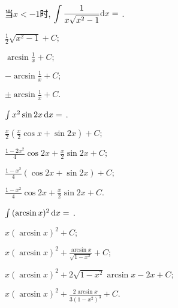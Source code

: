 \begin{problem} 当$x < - 1$时, $\displaystyle \int \frac{1}{x\sqrt{x^{2} - 1}}{\mathop{}\!\mathrm{d} x} =$ .

\begin{abcd} 
\item $\displaystyle \frac{1}{2}\sqrt{x^{2} - 1} + C; $

\item $\displaystyle \arcsin\frac{1}{x} + C; $

\item $\displaystyle - \arcsin\frac{1}{x} + C; $

\item $\displaystyle \pm \arcsin\frac{1}{x} + C.$

\end{abcd}

\end{problem}           

\begin{problem} $\int x^{2}\sin 2x\mathop{}\!\mathrm{d} x =$ .

\begin{abcd} 
	\item $\displaystyle \frac{x}{2}\left( \frac{x}{2}\cos x + \sin 2x \right) + C; $

\item $\displaystyle \frac{1 - 2x^{2}}{4}\cos 2x + \frac{x}{2}\sin 2x + C; $

\item $\displaystyle \frac{1 - x^{2}}{4}(\cos 2x + \sin 2x) + C; $

\item $\displaystyle \frac{1 - x^{2}}{4}\cos 2x + \frac{x}{2}\sin 2x + C.$

\end{abcd}

\end{problem}           

\begin{problem} $\int {(\arcsin x)^{2}}\mathop{}\!\mathrm{d} x =$ .

\begin{abcd} 
	\item $\displaystyle x(\arcsin x)^{2} + C; $

\item $\displaystyle x(\arcsin x)^{2} + \frac{\arcsin x}{\sqrt{1 - x^{2}}} + C; $

\item $\displaystyle x(\arcsin x)^{2} + 2\sqrt{1 - x^{2}}\arcsin x - 2x + C;$

\item
$\displaystyle x(\arcsin x)^{2} + \frac{2\arcsin x}{3\left( 1 - x^{2} \right)^{3}} + C.$

\end{abcd}

\end{problem}           

